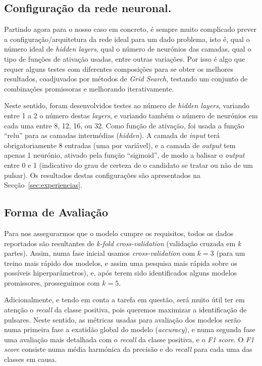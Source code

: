 \documentclass[]{article}
\begin{document}
\subsection{Configuração da rede neuronal.}
\label{sec:configuracao_rede}
    Partindo agora para o nosso caso em concreto, é sempre muito complicado prever a configuração/arquitetura da rede ideal para um dado problema, isto é, qual o número ideal de \textit{hidden layers}, qual o número de neurónios das camadas, qual o tipo de funções de ativação usadas, entre outras variações. Por isso é algo que requer alguns testes com diferentes composições para se obter os melhores resultados, coadjuvados por métodos de \textit{Grid Search}, testando um conjunto de combinações promissoras e melhorando iterativamente.
    
    Neste sentido, foram desenvolvidos testes ao número de \textit{hidden layers}, variando entre 1 a 2 o número destas \textit{layers}, e variando também o número de neurónios em cada uma entre 8, 12, 16, ou 32. Como função de ativação, foi usada a função ``relu'' para as camadas intermédias (\textit{hidden}).
    A camada de \textit{input} terá obrigatoriamente 8 entradas (uma por variável), e a camada de \textit{output} tem apenas 1 neurónio, ativado pela função ``sigmoid'', de modo a balisar o \textit{output} entre 0 e 1 (indicativo do grau de certeza de o candidato se tratar ou não de um pulsar).
    Os resultados destas configurações são apresentados na Secção~\ref{sec:experiencias}.

\subsection{Forma de Avaliação}
\label{sec:avaliacao}
Para nos assegurarmos que o modelo cumpre os requisitos, todos os dados reportados são resultantes de \textit{k-fold cross-validation} (validação cruzada em \textit{k} partes). Assim, numa fase inicial usamos \textit{cross-validation} com $k=3$ (para um treino mais rápido dos modelos, e assim uma pesquisa mais rápida sobre os possíveis hiperparâmetros), e, após terem sido identificados alguns modelos promissores, prosseguimos com $k=5$.

Adicionalmente, e tendo em conta a tarefa em questão, será muito útil ter em atenção o \textit{recall} da classe positiva, pois queremos maximizar a identificação de pulsares. Neste sentido, as métricas usadas para avaliação dos modelos serão numa primeira fase a exatidão global do modelo (\textit{accuracy}), e numa segunda fase uma avaliação mais detalhada com o \textit{recall} da classe positiva, e o \textit{F1 score}. O \textit{F1 score} consiste numa média harmónica da precisão e do \textit{recall} para cada uma das classes em causa.
\end{document}
